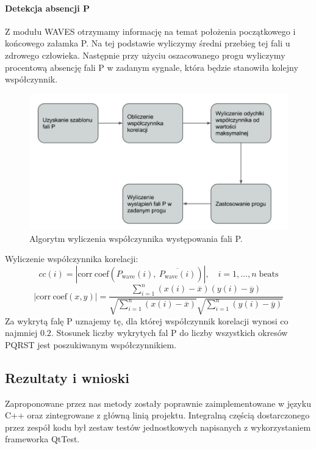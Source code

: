 \paragraph{Detekcja absencji P}
Z modułu WAVES otrzymamy informację na temat położenia początkowego i końcowego załamka P. 
Na tej podstawie wyliczymy średni przebieg tej fali u zdrowego człowieka. 
Następnie przy użyciu oszacowanego progu wyliczymy procentową absencję fali P w zadanym sygnale, 
która będzie stanowiła kolejny współczynnik.
\begin{figure}
  \centering
  \includegraphics[width=12cm]{ATRIAL_FIBR/img/PWaveFlow.jpg}
  \caption{Algorytm wyliczenia współczynnika występowania fali P.}
\end{figure}

Wyliczenie współczynnika korelacji:
\begin{equation}
cc(i) = |\mathrm{corr\:coef}(P_\mathrm{wave}(i),\: \overline{P_\mathrm{wave}(i)})|, \quad i = 1,\ldots,n\; \mathrm{beats}
\end{equation}
\begin{equation}
  |\mathrm{corr\:coef}(x,y)| = 
  \frac
      {\sum_{i=1}^{n}(x(i) - \overline{x})(y(i) - \overline{y})}
      {
        \sqrt{\sum_{i=1}^{n}(x(i) - \overline{x})}
        \sqrt{\sum_{i=1}^{n}(y(i) - \overline{y})}
      }
\end{equation}
Za wykrytą falę P uznajemy tę, dla której współczynnik korelacji wynosi co najmniej $0.2$.
Stosunek liczby wykrytych fal P do liczby wszystkich okresów PQRST jest poszukiwanym współczynnikiem.

\subsection{Rezultaty i wnioski}
Zaproponowane przez nas metody zostały poprawnie zaimplementowane w języku C++ oraz zintegrowane z główną linią projektu.
Integralną częścią dostarczonego przez zespół kodu był zestaw testów jednostkowych napisanych 
z wykorzystaniem frameworka QtTest.

